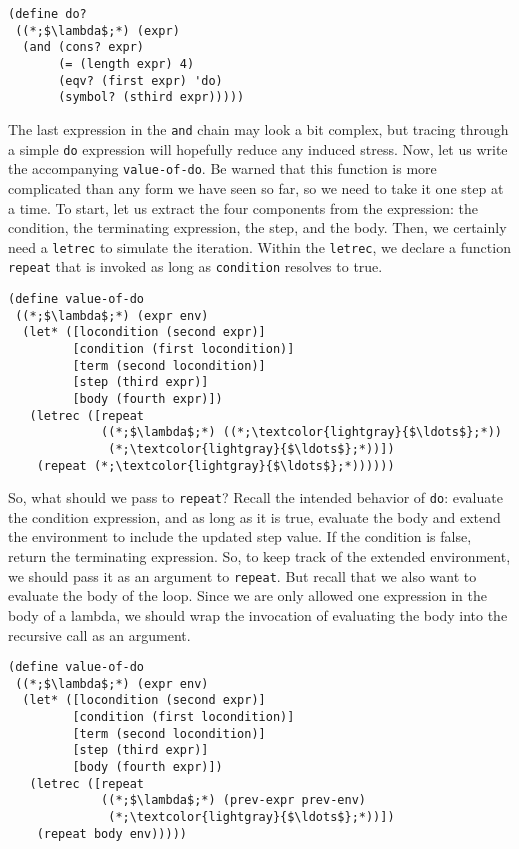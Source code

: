 \begin{cl}[]{}\begin{lstlisting}[language=MyScheme]
(define do?
 ((*;$\lambda$;*) (expr)
  (and (cons? expr)
       (= (length expr) 4)
       (eqv? (first expr) 'do)
       (symbol? (sthird expr)))))
\end{lstlisting}\end{cl}

The last expression in the \texttt{and} chain may look a bit complex, but tracing through a simple \texttt{do} expression will hopefully reduce any induced stress. Now, let us write the accompanying \texttt{value-of-do}. Be warned that this function is more complicated than any form we have seen so far, so we need to take it one step at a time. 
To start, let us extract the four components from the expression: the condition, the terminating expression, the step, and the body. Then, we certainly need a \texttt{letrec} to simulate the iteration. Within the \texttt{letrec}, we declare a function \texttt{repeat} that is invoked as long as \texttt{condition} resolves to true.

\begin{cl}[]{}\begin{lstlisting}[language=MyScheme]
(define value-of-do
 ((*;$\lambda$;*) (expr env)
  (let* ([locondition (second expr)]
         [condition (first locondition)]
         [term (second locondition)]
         [step (third expr)]
         [body (fourth expr)])
   (letrec ([repeat 
             ((*;$\lambda$;*) ((*;\textcolor{lightgray}{$\ldots$};*)) 
              (*;\textcolor{lightgray}{$\ldots$};*))])
    (repeat (*;\textcolor{lightgray}{$\ldots$};*))))))
\end{lstlisting}\end{cl}

So, what should we pass to \texttt{repeat}? Recall the intended behavior of \texttt{do}: evaluate the condition expression, and as long as it is true, evaluate the body and extend the environment to include the updated step value. If the condition is false, return the terminating expression. So, to keep track of the extended environment, we should pass it as an argument to \texttt{repeat}. But recall that we also want to evaluate the body of the loop. Since we are only allowed one expression in the body of a lambda, we should wrap the invocation of evaluating the body into the recursive call as an argument.

\begin{cl}[]{}\begin{lstlisting}[language=MyScheme]
(define value-of-do
 ((*;$\lambda$;*) (expr env)
  (let* ([locondition (second expr)]
         [condition (first locondition)]
         [term (second locondition)]
         [step (third expr)]
         [body (fourth expr)])
   (letrec ([repeat 
             ((*;$\lambda$;*) (prev-expr prev-env) 
              (*;\textcolor{lightgray}{$\ldots$};*))])
    (repeat body env)))))
\end{lstlisting}\end{cl}

